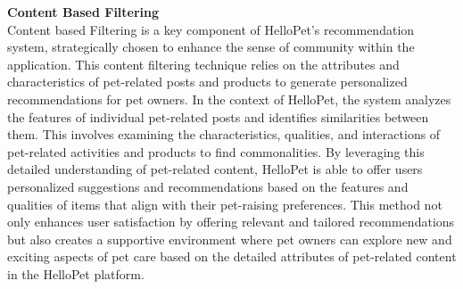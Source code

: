 \noindent\textbf{Content Based Filtering}\\
Content based Filtering is a key component of HelloPet's recommendation system, strategically chosen to enhance the sense of community within the application. This content filtering technique relies on the attributes and characteristics of pet-related posts and products to generate personalized recommendations for pet owners. In the context of HelloPet, the system analyzes the features of individual pet-related posts and identifies similarities between them. This involves examining the characteristics, qualities, and interactions of pet-related activities and products to find commonalities. By leveraging this detailed understanding of pet-related content, HelloPet is able to offer users personalized suggestions and recommendations based on the features and qualities of items that align with their pet-raising preferences.   This method not only enhances user satisfaction by offering relevant and tailored recommendations but also creates a supportive environment where pet owners can explore new and exciting aspects of pet care based on the detailed attributes of pet-related content in the HelloPet platform.

    

